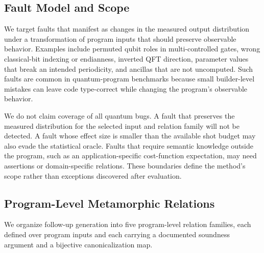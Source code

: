 \subsection{Fault Model and Scope}
\label{sec:fault-model}

We target faults that manifest as changes in the measured output distribution under a transformation of program inputs that should preserve observable behavior. Examples include permuted qubit roles in multi-controlled gates, wrong classical-bit indexing or endianness, inverted QFT direction, parameter values that break an intended periodicity, and ancillas that are not uncomputed. Such faults are common in quantum-program benchmarks because small builder-level mistakes can leave code type-correct while changing the program's observable behavior.

We do not claim coverage of all quantum bugs. A fault that preserves the measured distribution for the selected input and relation family will not be detected. A fault whose effect size is smaller than the available shot budget may also evade the statistical oracle. Faults that require semantic knowledge outside the program, such as an application-specific cost-function expectation, may need assertions or domain-specific relations. These boundaries define the method's scope rather than exceptions discovered after evaluation.

\subsection{Program-Level Metamorphic Relations}
\label{sec:relations}

We organize follow-up generation into five program-level relation families, each defined over program inputs and each carrying a documented soundness argument and a bijective canonicalization map.

